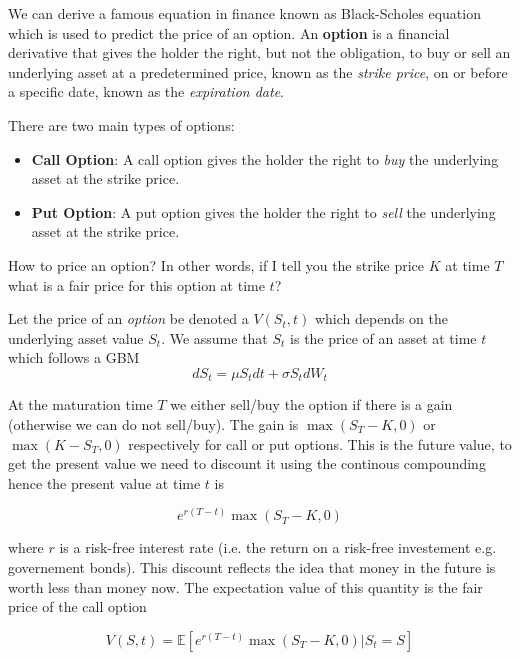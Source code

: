 \documentclass[11pt,a4paper]{article}
\begin{document}
We can derive a famous equation in finance known as Black-Scholes equation which is used to predict the price of an option.
An \textbf{option} is a financial derivative that gives the holder the right, but not the obligation, to buy or sell an underlying asset at a predetermined price, known as the \textit{strike price}, on or before a specific date, known as the \textit{expiration date}.

There are two main types of options:

\begin{itemize}
    \item \textbf{Call Option}: A call option gives the holder the right to \textit{buy} the underlying asset at the strike price.
    \item \textbf{Put Option}: A put option gives the holder the right to \textit{sell} the underlying asset at the strike price.
\end{itemize}

How to price an option? In other words, if I tell you the strike price $K$ at time $T$ what is a fair price for this option at time $t$?

Let the price of an \textit{option} be denoted a $V(S_t,t)$ which depends on the underlying asset value $S_t$. We assume that $S_t$ is the price of an asset at time $t$ which follows a GBM
\begin{equation}
dS_t = \mu S_t dt + \sigma S_t dW_t    
\end{equation}

At the maturation time $T$ we either sell/buy the option if there is a gain (otherwise we can do not sell/buy). The gain is $\max(S_T-K,0)$ or $\max(K-S_T,0)$ respectively for call or put options. This is the future value, to get the present value we need to discount it using the continous compounding hence the present value at time $t$ is

\begin{equation}
    e^{r(T-t)}\max(S_T-K,0)
\end{equation}

where $r$ is a risk-free interest rate (i.e. the return on a risk-free investement e.g. governement bonds). This discount reflects the idea that money in the future is worth less than money now.
The expectation value of this quantity is the fair price of the call option

\begin{equation}
    V(S,t) = \mathbb{E}[e^{r(T-t)}\max(S_T-K,0)|S_t = S]
\end{equation}
\end{document}
